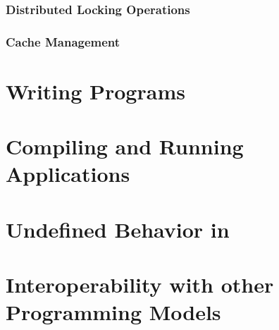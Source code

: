 \documentclass[10pt]{book}
\begin{document}
{\subsection{Distributed Locking Operations}
\cbstart \subsection{Cache Management} \cbend

\clearpage
%
%

\appendix
\pagestyle{fancy} \withlinenumbers
\fancyhf{}
\fancyhead[RE, LO]{\leftmark}
\fancyhead[RO, LE]{\thepage}
\fancyfoot[CE,CO]{\thepage}
\renewcommand{\headrulewidth}{0pt}
\chapter{Writing \openshmem Programs}

\chapter{Compiling and Running Applications}

\chapter{Undefined Behavior in \openshmem}
\label{sec:undefined}

\chapter{Interoperability with other Programming Models}
\label{sec:mpi}

\clearpage
}
\end{document}

